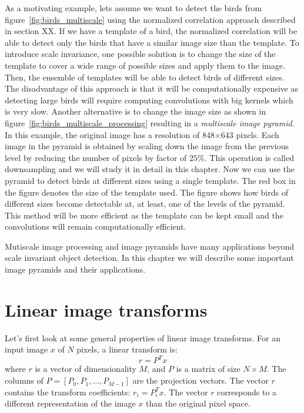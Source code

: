 As a motivating example, lets assume we want to detect the birds from figure~\ref{fig:birds_multiscale} using the normalized correlation approach described in section XX. If we have a template of a bird, the normalized correlation will be able to detect only the birds that have a similar image size than the template. To introduce scale invariance, one possible solution is to change the size of the template to cover a wide range of possible sizes and apply them to the image. Then, the ensemble of templates will be able to detect birds of different sizes. The disadvantage of this approach is that it will be computationally expensive as detecting large birds will require computing convolutions with big kernels which is very slow. Another alternative is to change the image size as shown in figure~\ref{fig:birds_multiscale_processing} resulting in a {\em multiscale image pyramid}. In this example, the original image has a resolution of 848$\times$643 pixels. Each image in the pyramid is obtained by scaling down the image from the previous level by reducing the number of pixels by factor of $25\%$. This operation is called downsampling and we will study it in detail in this chapter. Now we can use the pyramid to detect birds at different sizes using a single template. The red box in the figure denotes the size of the template used. The figure shows how birds of different sizes become detectable at, at least, one of the levels of the pyramid. This method will be more efficient as the template can be kept small and the convolutions will remain computationally efficient.

Mutiscale image processing and image pyramids have many applications beyond scale invariant object detection. In this chapter we will describe some important image pyramids and their applications.


\section{Linear image transforms}

Let's first look at some general properties of linear image transforms.  For an input image $x$ of $N$ pixels, a linear transform is:
\begin{equation}
	r = P^T x
\end{equation}
where $r$ is a vector of dimensionality $M$, and $P$ is  a matrix of size $N \times M$. The columns of $P = \left[P_0,  P_1, ...,P_{M-1}\right]$ are the projection vectors. The vector $r$ contains the transform coefficients: $r_i = P_i^T x$.  The vector $r$ corresponds to a different representation of the image $x$ than the original pixel space.

